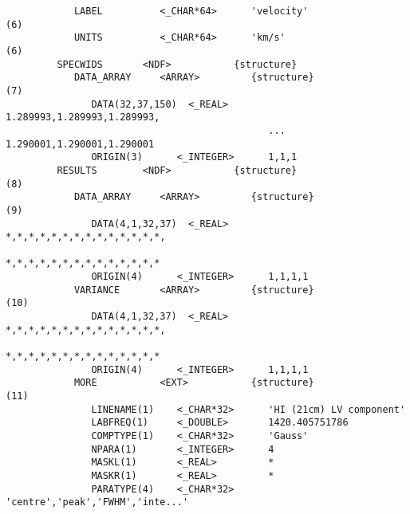 \begin{verbatim}
            LABEL          <_CHAR*64>      'velocity'                       (6)
            UNITS          <_CHAR*64>      'km/s'                           (6)
         SPECWIDS       <NDF>           {structure}
            DATA_ARRAY     <ARRAY>         {structure}                      (7)
               DATA(32,37,150)  <_REAL>       1.289993,1.289993,1.289993,
                                              ... 1.290001,1.290001,1.290001
               ORIGIN(3)      <_INTEGER>      1,1,1
         RESULTS        <NDF>           {structure}                         (8)
            DATA_ARRAY     <ARRAY>         {structure}                      (9)
               DATA(4,1,32,37)  <_REAL>       *,*,*,*,*,*,*,*,*,*,*,*,*,*,
                                              *,*,*,*,*,*,*,*,*,*,*,*,*,*
               ORIGIN(4)      <_INTEGER>      1,1,1,1
            VARIANCE       <ARRAY>         {structure}                     (10)
               DATA(4,1,32,37)  <_REAL>       *,*,*,*,*,*,*,*,*,*,*,*,*,*,
                                              *,*,*,*,*,*,*,*,*,*,*,*,*,*
               ORIGIN(4)      <_INTEGER>      1,1,1,1
            MORE           <EXT>           {structure}                     (11)
               LINENAME(1)    <_CHAR*32>      'HI (21cm) LV component'
               LABFREQ(1)     <_DOUBLE>       1420.405751786
               COMPTYPE(1)    <_CHAR*32>      'Gauss'
               NPARA(1)       <_INTEGER>      4
               MASKL(1)       <_REAL>         *
               MASKR(1)       <_REAL>         *
               PARATYPE(4)    <_CHAR*32>      'centre','peak','FWHM','inte...'
\end{verbatim}
\normalsize
\goodbreak
